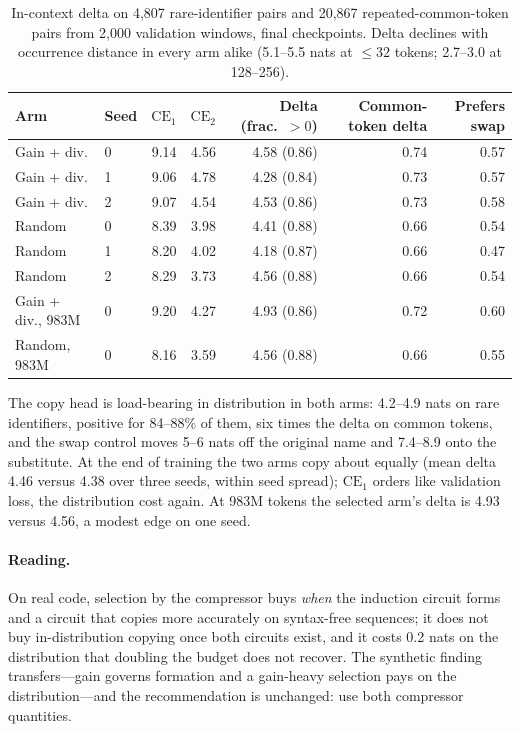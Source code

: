 \documentclass[11pt]{article}
\begin{document}
\begin{table}[t]\centering\small
\begin{tabular}{llrrrrr}\toprule
Arm & Seed & $\mathrm{CE}_1$ & $\mathrm{CE}_2$ & Delta (frac.\ $>0$) & Common-token delta & Prefers swap \\\midrule
Gain + div. & 0 & 9.14 & 4.56 & 4.58 (0.86) & 0.74 & 0.57 \\
Gain + div. & 1 & 9.06 & 4.78 & 4.28 (0.84) & 0.73 & 0.57 \\
Gain + div. & 2 & 9.07 & 4.54 & 4.53 (0.86) & 0.73 & 0.58 \\
Random      & 0 & 8.39 & 3.98 & 4.41 (0.88) & 0.66 & 0.54 \\
Random      & 1 & 8.20 & 4.02 & 4.18 (0.87) & 0.66 & 0.47 \\
Random      & 2 & 8.29 & 3.73 & 4.56 (0.88) & 0.66 & 0.54 \\\midrule
Gain + div., 983M & 0 & 9.20 & 4.27 & 4.93 (0.86) & 0.72 & 0.60 \\
Random, 983M      & 0 & 8.16 & 3.59 & 4.56 (0.88) & 0.66 & 0.55 \\\bottomrule
\end{tabular}
\caption{In-context delta on 4,807 rare-identifier pairs and 20,867
repeated-common-token pairs from 2,000 validation windows, final
checkpoints. Delta declines with occurrence distance in every arm alike
(5.1--5.5 nats at $\leq32$ tokens; 2.7--3.0 at 128--256).}
\label{tab:delta}
\end{table}

The copy head is load-bearing in distribution in both arms: 4.2--4.9 nats
on rare identifiers, positive for 84--88\% of them, six times the delta on
common tokens, and the swap control moves 5--6 nats off the original name
and 7.4--8.9 onto the substitute. At the end of training the two arms copy
about equally (mean delta 4.46 versus 4.38 over three seeds, within seed
spread); $\mathrm{CE}_1$ orders like validation loss, the distribution cost
again. At 983M tokens the selected arm's delta is 4.93 versus 4.56, a
modest edge on one seed.

\paragraph{Reading.}
On real code, selection by the compressor buys \emph{when} the induction
circuit forms and a circuit that copies more accurately on
syntax-free sequences; it does not buy in-distribution copying once both
circuits exist, and it costs 0.2 nats on the distribution that doubling
the budget does not recover. The synthetic finding transfers---gain
governs formation and a gain-heavy selection pays on the distribution---and
the recommendation is unchanged: use both compressor quantities.
\end{document}
